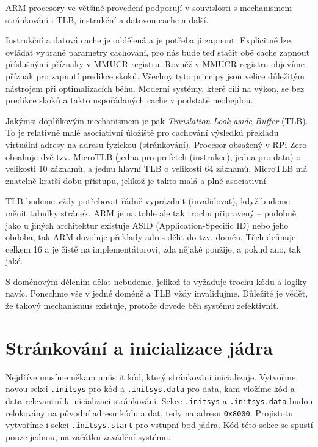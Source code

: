 \documentclass{article}
\begin{document}
ARM procesory ve většině provedení podporují v souvislosti s mechanismem stránkování i TLB, instrukční a datovou cache a další.

Instrukční a datová cache je oddělená a je potřeba ji zapnout. Explicitně lze ovládat vybrané parametry cachování, pro nás bude teď stačit obě cache zapnout příslušnými příznaky v MMUCR registru. Rovněž v MMUCR registru objevíme příznak pro zapnutí predikce skoků. Všechny tyto principy jsou velice důležitým nástrojem při optimalizacích běhu. Moderní systémy, které cílí na výkon, se bez predikce skoků a takto uspořádaných cache v podstatě neobejdou.

Jakýmsi doplňkovým mechanismem je pak \emph{Translation Look-aside Buffer} (TLB). To je relativně malé asociativní úložiště pro cachování výsledků překladu virtuální adresy na adresu fyzickou (stránkování). Procesor obsažený v RPi Zero obsahuje dvě tzv. MicroTLB (jedna pro prefetch (instrukce), jedna pro data) o velikosti 10 záznamů, a jednu hlavní TLB o velikosti 64 záznamů. MicroTLB má znatelně kratší dobu přístupu, jelikož je takto malá a plně asociativní.

TLB budeme vždy potřebovat řádně vyprázdnit (invalidovat), když budeme měnit tabulky stránek. ARM je na tohle ale tak trochu připravený -- podobně jako u jiných architektur existuje ASID (Application-Specific ID) nebo jeho obdoba, tak ARM dovoluje překlady adres dělit do tzv. domén. Těch definuje celkem 16 a je čistě na implementátorovi, zda nějaké použije, a pokud ano, tak jaké.

S doménovým dělením dělat nebudeme, jelikož to vyžaduje trochu kódu a logiky navíc. Ponechme vše v jedné doméně a TLB vždy invalidujme. Důležité je vědět, že takový mechanismus existuje, protože dovede běh systému zefektivnit.

\section{Stránkování a inicializace jádra}

Nejdříve musíme někam umístit kód, který stránkování inicializuje. Vytvořme novou sekci \texttt{.initsys} pro kód a \texttt{.initsys.data} pro data, kam vložíme kód a data relevantní k inicializaci stránkování. Sekce \texttt{.initsys} a \texttt{.initsys.data} budou relokovány na původní adresu kódu a dat, tedy na adresu \texttt{0x8000}. Projistotu vytvoříme i sekci \texttt{.initsys.start} pro vstupní bod jádra. Kód této sekce se spustí pouze jednou, na začátku zavádění systému.
\end{document}
